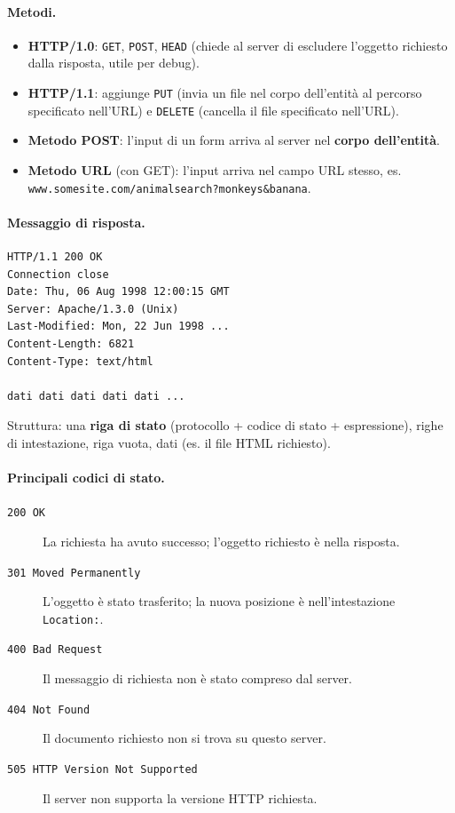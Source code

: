 \documentclass[12pt, a4paper]{article}
\begin{document}
\paragraph{Metodi.}
\begin{itemize}
    \item \textbf{HTTP/1.0}: \texttt{GET}, \texttt{POST}, \texttt{HEAD} (chiede al server di escludere l'oggetto richiesto dalla risposta, utile per debug).
    \item \textbf{HTTP/1.1}: aggiunge \texttt{PUT} (invia un file nel corpo dell'entità al percorso specificato nell'URL) e \texttt{DELETE} (cancella il file specificato nell'URL).
    \item \textbf{Metodo POST}: l'input di un form arriva al server nel \textbf{corpo dell'entità}.
    \item \textbf{Metodo URL} (con GET): l'input arriva nel campo URL stesso, es. \texttt{www.somesite.com/animalsearch?monkeys\&banana}.
\end{itemize}

\paragraph{Messaggio di risposta.}
\begin{verbatim}
HTTP/1.1 200 OK
Connection close
Date: Thu, 06 Aug 1998 12:00:15 GMT
Server: Apache/1.3.0 (Unix)
Last-Modified: Mon, 22 Jun 1998 ...
Content-Length: 6821
Content-Type: text/html

dati dati dati dati dati ...
\end{verbatim}
Struttura: una \textbf{riga di stato} (protocollo + codice di stato + espressione), righe di intestazione, riga vuota, dati (es. il file HTML richiesto).

\paragraph{Principali codici di stato.}
\begin{description}
    \item[\texttt{200 OK}] La richiesta ha avuto successo; l'oggetto richiesto è nella risposta.
    \item[\texttt{301 Moved Permanently}] L'oggetto è stato trasferito; la nuova posizione è nell'intestazione \texttt{Location:}.
    \item[\texttt{400 Bad Request}] Il messaggio di richiesta non è stato compreso dal server.
    \item[\texttt{404 Not Found}] Il documento richiesto non si trova su questo server.
    \item[\texttt{505 HTTP Version Not Supported}] Il server non supporta la versione HTTP richiesta.
\end{description}
\end{document}
